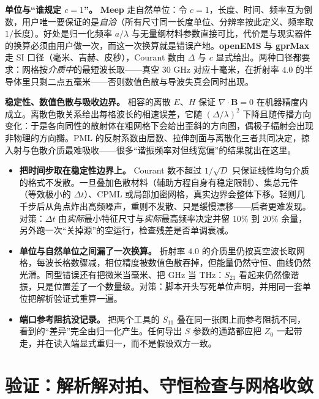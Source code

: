 \documentclass[12pt,a4paper,fontset=fandol]{ctexbook}
\newcommand{\Lib}[1]{\textbf{#1}}
\begin{document}
\textbf{单位与``谁规定 $c=1$''。} \Lib{Meep} 走自然单位：令 $c=1$，长度、时间、频率互为倒数，用户唯一要保证的是\emph{自洽}（所有尺寸同一长度单位、分辨率按此定义、频率取 $1/\text{长度}$）。好处是归一化频率 $a/\lambda$ 与无量纲材料参数直接可比，代价是与现实器件的换算必须由用户做一次，而这一次换算就是错误产地。\Lib{openEMS} 与 \Lib{gprMax} 走 SI 口径（毫米、吉赫、皮秒），Courant 数由 $\Delta$ 与 $c$ 显式给出。两种口径都要求：网格按\emph{介质中}的最短波长取——真空 $30$ GHz 对应十毫米，在折射率 $4.0$ 的半导体里只剩二点五毫米——否则数值色散与导波失真会同时出现。

\textbf{稳定性、数值色散与吸收边界。} 相容的离散 $E$、$H$ 保证 $\nabla \cdot \mathbf{B} = 0$ 在机器精度内成立。离散色散关系给出每格波长的相速误差，它随 $(\Delta/\lambda)^{2}$ 下降且随传播方向变化：于是各向同性的散射体在粗网格下会给出歪斜的方向图，偶极子辐射会出现非物理的方向瓣。PML 的反射系数由层数、拉伸剖面与离散化三者共同决定，掠入射与色散介质最难吸收——很多``谐振频率对但线宽偏''的结果就出在这里。

\begin{warning}[title={稳定但物理错的两条最快路径}]
\begin{itemize}
\item \textbf{把时间步取在稳定性边界上。} Courant 数不超过 $1/\sqrt{D}$ 只保证线性均匀介质的格式不发散。一旦叠加色散材料（辅助方程自身有稳定限制）、集总元件（等效极小的 $\Delta t$）、CPML 或局部加密网格，真实边界会整体下移。轻则几千步后从角点炸出高频噪声，重则不发散、只是缓慢漂移——后者更难发现。对策：$\Delta t$ 由\emph{实际}最小特征尺寸与\emph{实际}最高频率决定并留 $10\%$ 到 $20\%$ 余量，另外跑一次``关掉源''的空运行，检查残差是否单调衰减。
\item \textbf{单位与自然单位之间漏了一次换算。} 折射率 $4.0$ 的介质里仍按真空波长取网格，每波长格数骤减，相位精度被数值色散吞掉，但能量仍然守恒、曲线仍然光滑。同型错误还有把微米当毫米、把 GHz 当 THz：$S_{21}$ 看起来仍然像谐振，只是位置差了一个数量级。对策：脚本开头写死单位声明，并用同一套单位把解析验证式重算一遍。
\item \textbf{端口参考阻抗没记录。} 把两个工具的 $S_{11}$ 叠在同一张图上而参考阻抗不同，看到的``差异''完全由归一化产生。任何导出 $S$ 参数的通路都应把 $Z_0$ 一起带走，并在读入端显式重归一，而不是假设双方一致。
\end{itemize}
\end{warning}

\section{验证：解析解对拍、守恒检查与网格收敛}
\end{document}
